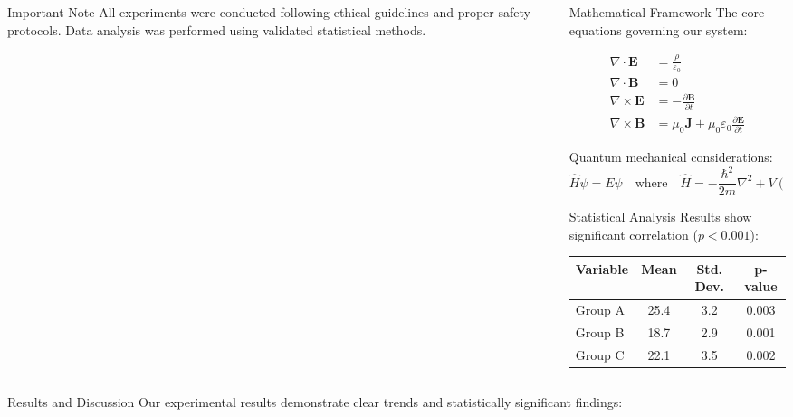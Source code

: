 \documentclass[xcolor={svgnames}]{beamer}
\begin{document}
\begin{frame}
\begin{columns}
\begin{column}{.33\textwidth}
\begin{alertblock}{Important Note}
All experiments were conducted following ethical guidelines and proper safety protocols. Data analysis was performed using validated statistical methods.
\end{alertblock}
\end{column}
%
\begin{column}{.33\textwidth}
\begin{block}{Mathematical Framework}
The core equations governing our system:

\begin{align*}
\nabla \cdot \mathbf{E} &= \frac{\rho}{\varepsilon_0} \\
\nabla \cdot \mathbf{B} &= 0 \\
\nabla \times \mathbf{E} &= -\frac{\partial \mathbf{B}}{\partial t} \\
\nabla \times \mathbf{B} &= \mu_0\mathbf{J} + \mu_0\varepsilon_0\frac{\partial \mathbf{E}}{\partial t}
\end{align*}

Quantum mechanical considerations:
\[
\hat{H}\psi = E\psi \quad \text{where} \quad \hat{H} = -\frac{\hbar^2}{2m}\nabla^2 + V(\mathbf{r})
\]
\end{block}

\begin{block}{Statistical Analysis}
Results show significant correlation ($p < 0.001$):

\begin{center}
\begin{tabular}{lccc}
\toprule
Variable & Mean & Std. Dev. & p-value \\
\midrule
Group A & 25.4 & 3.2 & 0.003 \\
Group B & 18.7 & 2.9 & 0.001 \\
Group C & 22.1 & 3.5 & 0.002 \\
\bottomrule
\end{tabular}
\end{center}
\end{block}
\end{column}
\end{columns}

\vspace{1cm}

\begin{columns}
\begin{column}{.7\textwidth}
\begin{block}{Results and Discussion}
Our experimental results demonstrate clear trends and statistically significant findings:


\end{block}
\end{column}
\end{columns}
\end{frame}
\end{document}
